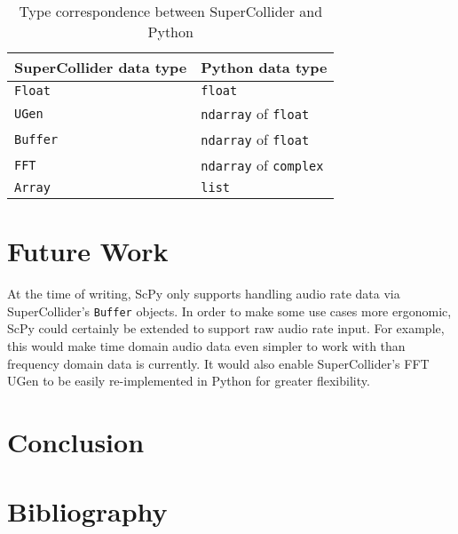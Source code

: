 \documentclass{article}
\begin{document}
\begin{table}[H]
    \caption{Type correspondence between SuperCollider and Python}
    \begin{center}
        \begin{tabular}{| l | l |}
            \hline
            SuperCollider data type & Python data type \\ \hline
            \texttt{Float} & \texttt{float} \\ \hline
            \texttt{UGen} & \texttt{ndarray} of \texttt{float} \\ \hline
            \texttt{Buffer} & \texttt{ndarray} of \texttt{float} \\ \hline
            \texttt{FFT} & \texttt{ndarray} of \texttt{complex} \\ \hline
            \texttt{Array} & \texttt{list} \\ \hline
        \end{tabular}
    \end{center}
\end{table}

\section{Future Work}

At the time of writing, ScPy only supports handling audio rate data via SuperCollider's
\texttt{Buffer} objects. In order to make some use cases more ergonomic, ScPy could certainly be
extended to support raw audio rate input. For example, this would make time domain audio data even
simpler to work with than frequency domain data is currently. It would also enable SuperCollider's
FFT UGen to be easily re-implemented in Python for greater flexibility.

\section{Conclusion}

\section{Bibliography}
\end{document}
